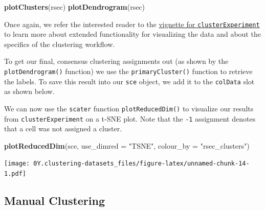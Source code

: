 \documentclass[]{book}
\newenvironment{Shaded}{\begin{snugshade}}{\end{snugshade}}
\newcommand{\CommentTok}[1]{\textcolor[rgb]{0.56,0.35,0.01}{\textit{#1}}}
\newcommand{\DataTypeTok}[1]{\textcolor[rgb]{0.13,0.29,0.53}{#1}}
\newcommand{\KeywordTok}[1]{\textcolor[rgb]{0.13,0.29,0.53}{\textbf{#1}}}
\newcommand{\NormalTok}[1]{#1}
\newcommand{\OperatorTok}[1]{\textcolor[rgb]{0.81,0.36,0.00}{\textbf{#1}}}
\newcommand{\StringTok}[1]{\textcolor[rgb]{0.31,0.60,0.02}{#1}}
\begin{document}
\begin{Shaded}
\begin{Highlighting}[]
\KeywordTok{plotClusters}\NormalTok{(rsec)}
\KeywordTok{plotDendrogram}\NormalTok{(rsec)}
\end{Highlighting}
\end{Shaded}

Once again, we refer the interested reader to the \href{https://bioconductor.org/packages/release/bioc/html/clusterExperiment.html}{vignette for \texttt{clusterExperiment}} to learn more about extended functionality for visualizing the data and about the specifics of the clustering workflow.

To get our final, consensus clustering assignments out (as shown by the \texttt{plotDendrogram()} function) we use the \texttt{primaryCluster()} function to retrieve the labels. To save this result into our \texttt{sce} object, we add it to the \texttt{colData} slot as shown below.

\begin{Shaded}
\end{Shaded}

We can now use the \texttt{scater} function \texttt{plotReducedDim()} to visualize our results from \texttt{clusterExperiment} on a t-SNE plot. Note that the \texttt{-1} assignment denotes that a cell was not assigned a cluster.

\begin{Shaded}
\begin{Highlighting}[]
\KeywordTok{plotReducedDim}\NormalTok{(sce, }\DataTypeTok{use_dimred =} \StringTok{"TSNE"}\NormalTok{, }\DataTypeTok{colour_by =} \StringTok{"rsec_clusters"}\NormalTok{)}
\end{Highlighting}
\end{Shaded}

\texttt{[image: 0Y.clustering-datasets\_files/figure-latex/unnamed-chunk-14-1.pdf]}

\hypertarget{manual-clustering}{%
\subsection{Manual Clustering}\label{manual-clustering}}
\end{document}
